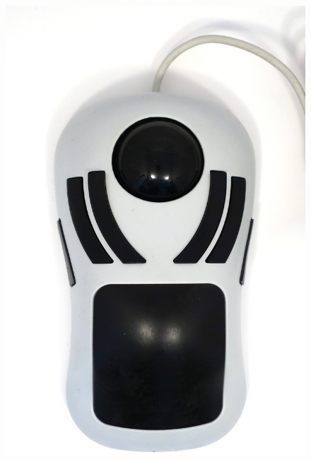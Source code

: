 \documentclass[11pt, a4paper]{article}
\begin{document}
\begin{figure}[h]
    \centering
    \includegraphics[scale=0.35]{1997_mousetrak_evolution/top_60.jpg}

\end{figure}
\end{document}
